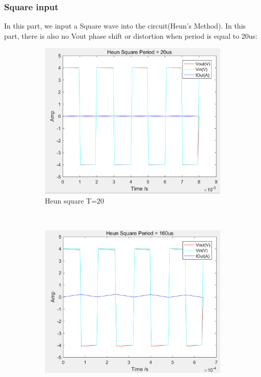 \documentclass[a4paper, 12pt]{article}
\begin{document}
\newpage

\subsubsection{Square input}
In this part, we input a Square wave into the circuit(Heun's Method). In this part, there is also no Vout phase shift or distortion when period is equal to 20us:
\begin{figure}[h]
      \centering
      \begin{subfigure}[b]{0.4\textwidth}
            \includegraphics[width=\textwidth]{ex1/heun_square_20.PNG}
            \caption{Heun square T=20}
      \end{subfigure}
      ~
      \begin{subfigure}[b]{0.4\textwidth}
            \includegraphics[width=\textwidth]{ex1/heun_square_160.PNG}

\end{subfigure}
\end{figure}
\end{document}
